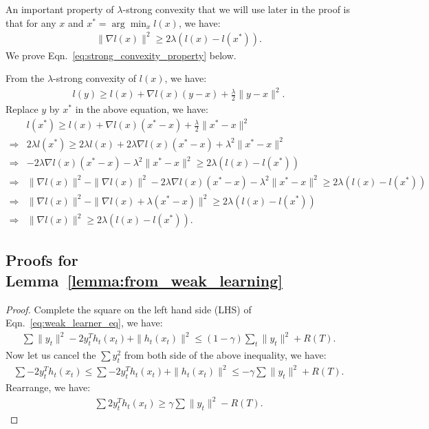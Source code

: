 An important property of $\lambda$-strong convexity that we will use later in the proof is that for any $x$ and $x^*=\arg\min_x l(x)$, we have:
\begin{align}
\label{eq:strong_convexity_property}
\|\nabla l(x)\|^2 \geq 2\lambda (l(x) - l(x^*)).
\end{align}We prove Eqn.~\ref{eq:strong_convexity_property} below.



From the $\lambda$-strong convexity of $l(x)$, we have:
\begin{align}
l(y) \geq l(x) + \nabla l(x)(y-x) + \frac{\lambda}{2}\|y - x\|^2.
\end{align} Replace $y$ by $x^*$ in the above equation, we have:
\begin{align}
&l(x^*) \geq l(x) + \nabla l(x)(x^* - x) + \frac{\lambda}{2}\|x^* - x\|^2 \nonumber \\
\Rightarrow & 2\lambda l(x^*) \geq 2\lambda l(x) + 2\lambda \nabla l(x)(x^* - x) + \lambda^2\|x^* - x\|^2 \nonumber \\
\Rightarrow & -2\lambda \nabla l(x)(x^* - x) - \lambda^2\|x^* - x\|^2 \geq 2\lambda (l(x) - l(x^*)) \nonumber \\
\Rightarrow &  \|\nabla l(x)\|^2 - \|\nabla l(x)\|^2-2\lambda \nabla l(x)(x^* - x) - \lambda^2\|x^* - x\|^2 \geq 2\lambda (l(x) - l(x^*)) \nonumber \\
\Rightarrow & \|\nabla l(x)\|^2 - \|\nabla l(x) + \lambda (x^* - x)\|^2 \geq 2\lambda(l(x) - l(x^*)) \nonumber \\
\Rightarrow & \|\nabla l(x)\|^2 \geq 2\lambda (l(x) - l(x^*)).
\end{align}

\subsection{Proofs for Lemma~\ref{lemma:from_weak_learning}}
\begin{proof}
Complete the square on the left hand side (LHS) of Eqn.~\ref{eq:weak_learner_eq}, we have:
\begin{align}
\sum \|y_t\|^2 - 2y_t^Th_t(x_t) + \|h_t(x_t)\|^2 \leq (1-\gamma)\sum_t \|y_t\|^2 + R(T).
\end{align} Now let us cancel the $\sum y_t^2$ from both side of the above inequality, we have:
\begin{align}
\sum -2y_t^T h_t(x_t) \leq \sum -2y_t^T h_t(x_t) + \|h_t(x_t)\|^2 \leq -\gamma\sum \|y_t\|^2 + R(T).
\end{align} Rearrange, we have:
\begin{align}
\sum 2y_t^T h_t(x_t) \geq \gamma\sum \|y_t\|^2 - R(T).
\end{align} 
\end{proof}

